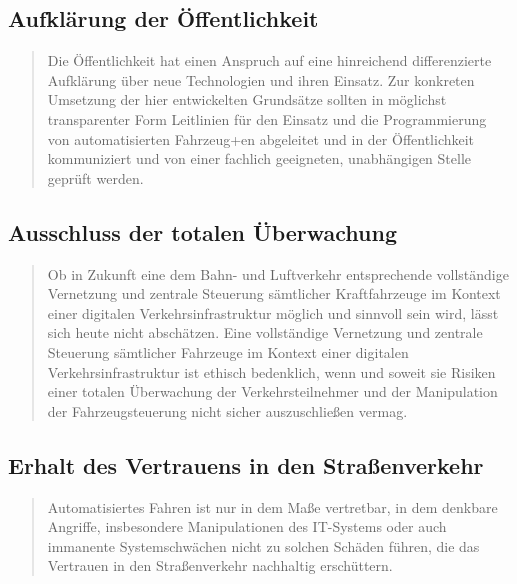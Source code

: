 \documentclass[twoside,a4paper,12pt]{article}
\begin{document}
\subsection{Aufklärung der Öffentlichkeit} \label{AufklaerungDerOeffentlichkeit}

\begin{quote}
\glqq
Die Öffentlichkeit hat einen Anspruch auf eine hinreichend differenzierte Aufklärung
über neue Technologien und ihren Einsatz. Zur konkreten Umsetzung der hier entwickelten Grundsätze sollten in möglichst 
transparenter Form Leitlinien für den Einsatz und die
Programmierung von automatisierten Fahrzeug+en abgeleitet und in der Öffentlichkeit
kommuniziert und von einer fachlich geeigneten, unabhängigen Stelle geprüft werden.\grqq\mbox{~\cite[S. 12]{ek}}
\end{quote}

\subsection{Ausschluss der totalen Überwachung} \label{AusschlussDerTotalenUeberwachung}

\begin{quote}
\glqq
Ob in Zukunft eine dem Bahn- und Luftverkehr entsprechende vollständige Vernetzung
und zentrale Steuerung sämtlicher Kraftfahrzeuge im Kontext einer digitalen Verkehrsinfrastruktur möglich und sinnvoll sein wird, 
lässt sich heute nicht abschätzen. Eine vollständige Vernetzung und zentrale Steuerung sämtlicher Fahrzeuge im Kontext einer 
digitalen Verkehrsinfrastruktur ist ethisch bedenklich, wenn und soweit sie Risiken einer totalen Überwachung der Verkehrsteilnehmer 
und der Manipulation der Fahrzeugsteuerung nicht sicher auszuschließen vermag.\grqq\mbox{~\cite[S. 12]{ek}}
\end{quote}

\subsection{Erhalt des Vertrauens in den Straßenverkehr} \label{ErhaltDesVertrauensInDenStrassenverkehr}

\begin{quote}
\glqq
Automatisiertes Fahren ist nur in dem Maße vertretbar, in dem denkbare Angriffe, insbesondere Manipulationen des 
IT-Systems oder auch immanente Systemschwächen nicht
zu solchen Schäden führen, die das Vertrauen in den Straßenverkehr nachhaltig erschüttern.\grqq\mbox{~\cite[S. 12]{ek}}
\end{quote}
\end{document}
